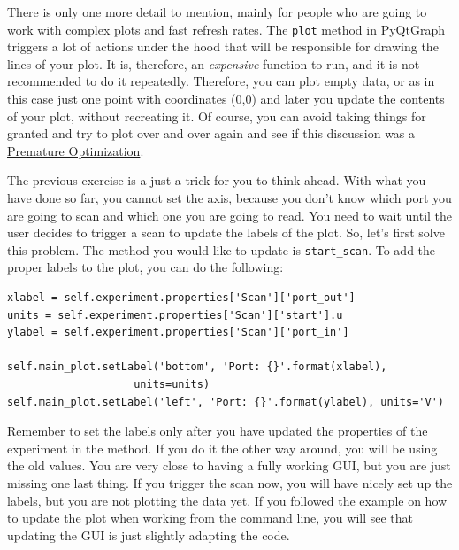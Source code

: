 There is only one more detail to mention, mainly for people who are
going to work with complex plots and fast refresh rates. The
\texttt{plot} method in PyQtGraph triggers a lot of actions under the
hood that will be responsible for drawing the lines of your plot. It is,
therefore, an \emph{expensive} function to run, and it is not
recommended to do it repeatedly. Therefore, you can plot empty data, or
as in this case just one point with coordinates (0,0) and later you
update the contents of your plot, without recreating it. Of course, you
can avoid taking things for granted and try to plot over and over again
and see if this discussion was a
\href{http://wiki.c2.com/?PrematureOptimization}{Premature
Optimization}.


The previous exercise is a just a trick for you to think ahead. With
what you have done so far, you cannot set the axis, because you don't
know which port you are going to scan and which one you are going to
read. You need to wait until the user decides to trigger a scan to
update the labels of the plot. So, let's first solve this problem. The method you would like to update is \texttt{start_scan}. To add the
proper labels to the plot, you can do the following:

\begin{verbatim}
xlabel = self.experiment.properties['Scan']['port_out']
units = self.experiment.properties['Scan']['start'].u
ylabel = self.experiment.properties['Scan']['port_in']

self.main_plot.setLabel('bottom', 'Port: {}'.format(xlabel),
                    units=units)
self.main_plot.setLabel('left', 'Port: {}'.format(ylabel), units='V')
\end{verbatim}

Remember to set the labels only after you have updated the properties of
the experiment in the method. If you do it the other way around, you
will be using the old values. You are very close to having a fully
working {GUI}, but you are just missing one last thing. If you trigger
the scan now, you will have nicely set up the labels, but you are not
plotting the data yet. If you followed the example on how to update the
plot when working from the command line, you will see that updating the
{GUI} is just slightly adapting the code.

